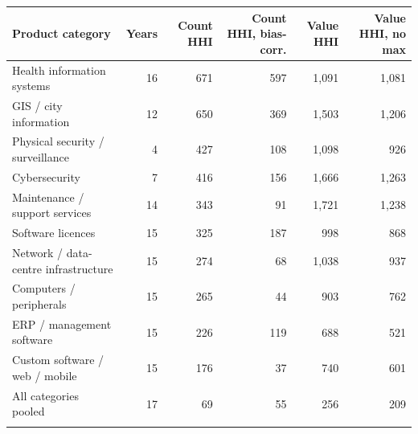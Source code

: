 \begin{tabular}{@{}lrrrrr@{}}
\toprule
Product category & Years & Count HHI & Count HHI, bias-corr. & Value HHI & Value HHI, no max\\
\midrule
Health information systems & 16 & 671 & 597 & 1,091 & 1,081\\
GIS / city information & 12 & 650 & 369 & 1,503 & 1,206\\
Physical security / surveillance & 4 & 427 & 108 & 1,098 & 926\\
Cybersecurity & 7 & 416 & 156 & 1,666 & 1,263\\
Maintenance / support services & 14 & 343 & 91 & 1,721 & 1,238\\
Software licences & 15 & 325 & 187 & 998 & 868\\
Network / data-centre infrastructure & 15 & 274 & 68 & 1,038 & 937\\
Computers / peripherals & 15 & 265 & 44 & 903 & 762\\
ERP / management software & 15 & 226 & 119 & 688 & 521\\
Custom software / web / mobile & 15 & 176 & 37 & 740 & 601\\
All categories pooled & 17 & 69 & 55 & 256 & 209\\
\botrule
\end{tabular}